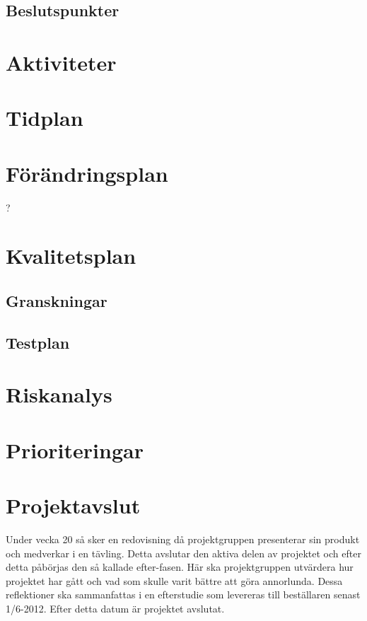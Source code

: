 \documentclass[a4paper,12pt]{article}
\begin{document}
\subsection{Beslutspunkter}

\section{Aktiviteter}

\section{Tidplan}

\section{Förändringsplan}	%
?

\section{Kvalitetsplan}	%
\subsection{Granskningar}
\subsection{Testplan}

\section{Riskanalys} %

\section{Prioriteringar}


\section{Projektavslut} %
Under vecka 20 så sker en redovisning då projektgruppen presenterar sin produkt och medverkar i en tävling. Detta avslutar den aktiva delen av projektet och efter detta påbörjas den så kallade efter-fasen. Här ska projektgruppen utvärdera hur projektet har gått och vad som skulle varit bättre att göra annorlunda. Dessa reflektioner ska sammanfattas i en efterstudie som levereras till beställaren senast 1/6-2012. Efter detta datum är projektet avslutat.
\end{document}
